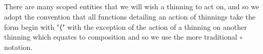 \begin{code}%
\>[0]\AgdaSpace{}%
\AgdaSymbol{:}\AgdaSpace{}%
\AgdaSpace{}%
\AgdaSpace{}%
\<%
\\
\>[0]\AgdaSpace{}%
\AgdaSpace{}%
\AgdaSymbol{=}\AgdaSpace{}%
\AgdaSpace{}%
\AgdaSymbol{\{}\AgdaSymbol{\}}\AgdaSpace{}%
\AgdaSymbol{\{}\AgdaSymbol{\}}\AgdaSpace{}%
\AgdaSpace{}%
\AgdaSpace{}%
\AgdaSpace{}%
\AgdaSpace{}%
\AgdaSymbol{(}\AgdaSpace{}%
\AgdaSpace{}%
\AgdaSymbol{)}\AgdaSpace{}%
\AgdaSpace{}%
\AgdaSpace{}%
\<%
\\
%
\\[\AgdaEmptyExtraSkip]%
\>[0]\AgdaSpace{}%
\AgdaSymbol{:}\AgdaSpace{}%
\AgdaSpace{}%
\AgdaSpace{}%
\<%
\\
\>[0]\AgdaSpace{}%
\AgdaSpace{}%
\AgdaSymbol{=}\AgdaSpace{}%
\AgdaSpace{}%
\AgdaSymbol{\{}\AgdaSymbol{\}}\AgdaSpace{}%
\AgdaSymbol{\{}\AgdaSymbol{\}}\AgdaSpace{}%
\AgdaSpace{}%
\AgdaSymbol{(}\AgdaSpace{}%
\AgdaSpace{}%
\AgdaSymbol{)}\AgdaSpace{}%
\AgdaSpace{}%
\AgdaSpace{}%
\AgdaSpace{}%
\AgdaSpace{}%
\AgdaSpace{}%
\<%
\end{code}

There are many scoped entities that we will wish a thinning to act on,
and so we adopt the convention that all functions detailing an action
of thinnings take the form begin with "⟨" with the exception of the
action of a thinning on another thinning which equates to composition
and so we use the more traditional $∘$ notation.

\begin{code}%
\>[0]%
\>[10]\AgdaSymbol{:}\AgdaSpace{}%
\AgdaSpace{}%
\AgdaSymbol{(}\AgdaSpace{}%
\AgdaSymbol{)}\<%
\\
\>[0]%
\>[10]\AgdaSymbol{:}\AgdaSpace{}%
\AgdaSpace{}%
\<%
\\
\>[0]%
\>[10]\AgdaSymbol{:}\AgdaSpace{}%
\AgdaSpace{}%
\AgdaSymbol{(}\AgdaSpace{}%
\AgdaSymbol{)}\<%
\end{code}

